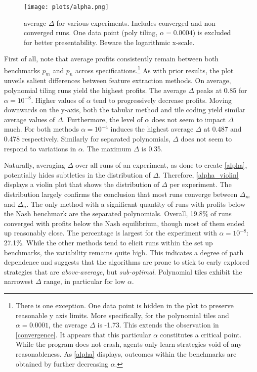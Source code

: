 \begin{figure}
	\texttt{[image: plots/alpha.png]}
	\caption{average $\Delta$ for various experiments. Includes converged and non-converged runs. One data point (poly tiling, $\alpha = 0.0004$) is excluded for better presentability. Beware the logarithmic x-scale.}
	\label{alpha}
\end{figure}

First of all, note that average profits consistently remain between both benchmarks $p_m$ and $p_n$ across specifications.\footnote{There is one exception. One data point is hidden in the plot to preserve reasonable y axis limits. More specifically, for the polynomial tiles and $\alpha = 0.0001$, the average $\Delta$ is -1.73. This extends the observation in \autoref{convergence}. It appears that this particular $\alpha$ constitutes a critical point. While the program does not crash, agents only learn strategies void of any reasonableness. As \autoref{alpha} displays, outcomes within the benchmarks are obtained by further decreasing $\alpha$.} As with prior results, the plot unveils salient differences between feature extraction methods.  On average, polynomial tiling runs yield the highest profits. The average $\Delta$ peaks at 0.85 for $\alpha = 10^{-8}$. Higher values of $\alpha$ tend to progressively decrease profits. Moving downwards on the y-axis, both the tabular method and tile coding yield similar average values of $\Delta$. Furthermore, the level of $\alpha$ does not seem to impact $\Delta$ much. For both methods $\alpha = 10^{-4}$ induces the highest average $\Delta$ at 0.487 and 0.478 respectively. Similarly for separated polynomials, $\Delta$ does not seem to respond to variations in $\alpha$. The maximum $\Delta$ is 0.35.

Naturally, averaging $\Delta$ over all runs of an experiment, as done to create \autoref{alpha}, potentially hides subtleties in the distribution of $\Delta$. Therefore, \autoref{alpha_violin} displays a violin plot that shows the distribution of $\Delta$ per experiment. The distribution largely confirms the conclusion that most runs converge between $\Delta_m$ and $\Delta_n$. The only method with a significant quantity of runs with profits below the Nash benchmark are the separated polynomials. Overall, 19.8\% of runs converged with profits below the Nash equilibrium, though most of them ended up reasonably close. The percentage is largest for the experiment with $\alpha = 10^{-8}$: 27.1\%. While the other methods tend to elicit runs within the set up benchmarks, the variability remains quite high. This indicates a degree of path dependence and suggests that the algorithms are prone to stick to early explored strategies that are \emph{above-average}, but \emph{sub-optimal}. Polynomial tiles exhibit the narrowest $\Delta$ range, in particular for low $\alpha$.

